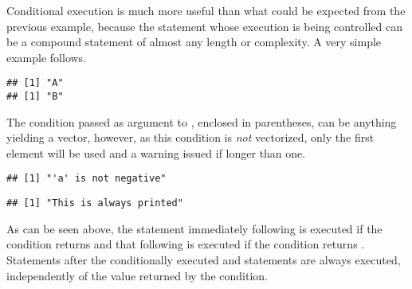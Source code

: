 \documentclass[krantz2]{krantz}\usepackage{knitr}%
\begin{document}
Conditional execution is much more useful than what could be expected from the previous example, because the statement whose execution is being controlled can be a compound statement of almost any length or complexity. A very simple example follows.

\begin{knitrout}\footnotesize
{}\color{fgcolor}\begin{kframe}
\begin{alltt}
 \hlkwb{<-} 
 
  \hlstd{(}\hlstd{)}
  \hlstd{(}\hlstd{)}
\hlstd{\}}
\end{alltt}
\begin{verbatim}
## [1] "A"
## [1] "B"
\end{verbatim}
\end{kframe}
\end{knitrout}

The condition passed as argument to , enclosed in parentheses, can be anything yielding a  vector, however, as this condition is \emph{not} vectorized, only the first element will be used and a warning issued if longer than one.

\begin{knitrout}\footnotesize
{}\color{fgcolor}\begin{kframe}
\begin{alltt}
 \hlkwb{<-} 
  \hlopt{<} \hlstd{)} \hlstd{(}\hlstd{)}  \hlstd{(}\hlstd{)}
\end{alltt}
\begin{verbatim}
## [1] "'a' is not negative"
\end{verbatim}
\begin{alltt}
\hlstd{(}\hlstd{)}
\end{alltt}
\begin{verbatim}
## [1] "This is always printed"
\end{verbatim}
\end{kframe}
\end{knitrout}

As can be seen above, the statement immediately following  is executed if the condition returns  and that following  is executed if the condition returns . Statements after the conditionally executed  and  statements are always executed, independently of the value returned by the condition.
\end{document}
